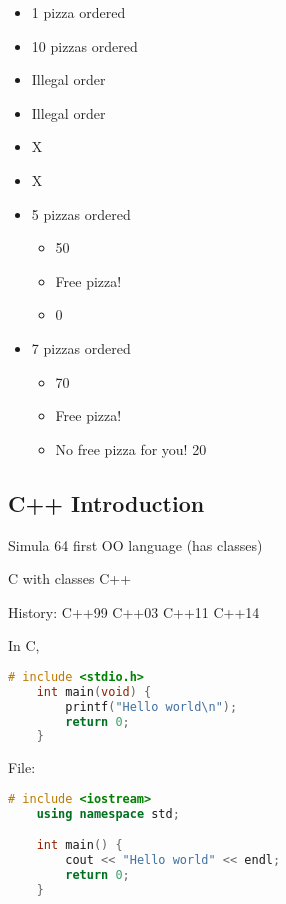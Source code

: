 \begin{itemize}
    \item {} \textrightarrow{} 1 pizza ordered
    \item {} \textrightarrow{} 10 pizzas ordered
    \item {} \textrightarrow{} Illegal order
    \item {} \textrightarrow{} Illegal order
    \item {} \textrightarrow{} X
    \item {} \textrightarrow{} X
    \item {} \textrightarrow{} 5 pizzas ordered
          \begin{itemize}
              \item {} \textrightarrow{} 50
              \item {} \textrightarrow{} Free pizza!
              \item {} \textrightarrow{} 0
          \end{itemize}
    \item {} \textrightarrow{} 7 pizzas ordered
          \begin{itemize}
              \item {} \textrightarrow{} 70
              \item {} \textrightarrow{} Free pizza!
              \item {} \textrightarrow{} No free pizza for you! 20
          \end{itemize}
\end{itemize}

\subsection{C++ Introduction}
Simula 64 \textrightarrow{} first OO language (has classes)

C with classes \textrightarrow{} C++

History: C++99 \textrightarrow{} C++03 \textrightarrow{} C++11 \textrightarrow{} C++14

In C,
\begin{lstlisting}[language = C]
    # include <stdio.h>
    int main(void) {
        printf("Hello world\n");
        return 0;
    }
\end{lstlisting}
File: 
\begin{lstlisting}[language = C++]
    # include <iostream>
    using namespace std;

    int main() {
        cout << "Hello world" << endl;
        return 0;
    }
\end{lstlisting}


